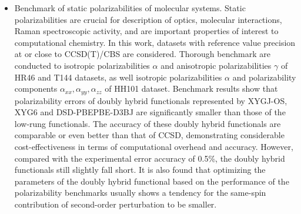 \begin{abstract*}
\begin{enumerate}[nosep]
\begin{itemize}[nosep]
    \item Benchmark of static polarizabilities of molecular systems. Static polarizabilities are crucial for description of optics, molecular interactions, Raman spectroscopic activity, and are important properties of interest to computational chemistry. In this work, datasets with reference value precision at or close to CCSD(T)/CBS are considered. Thorough benchmark are conducted to isotropic polarizabilities $\alpha$ and anisotropic polarizabilities $\gamma$ of HR46 and T144 datasets, as well isotropic polarizabilities $\alpha$ and polarizability components $\alpha_{xx}, \alpha_{yy}, \alpha_{zz}$ of HH101 dataset. Benchmark results show that polarizability errors of doubly hybrid functionals represented by XYGJ-OS, XYG6 and DSD-PBEPBE-D3BJ are significantly smaller than those of the low-rung functionals. The accuracy of these doubly hybrid functionals are comparable or even better than that of CCSD, demonstrating considerable cost-effectiveness in terms of computational overhead and accuracy. However, compared with the experimental error accuracy of 0.5\%, the doubly hybrid functionals still slightly fall short. It is also found that optimizing the parameters of the doubly hybrid functional based on the performance of the polarizability benchmarks usually shows a tendency for the same-spin contribution of second-order perturbation to be smaller.
\end{itemize}
\end{enumerate}
    
\end{abstract*}
